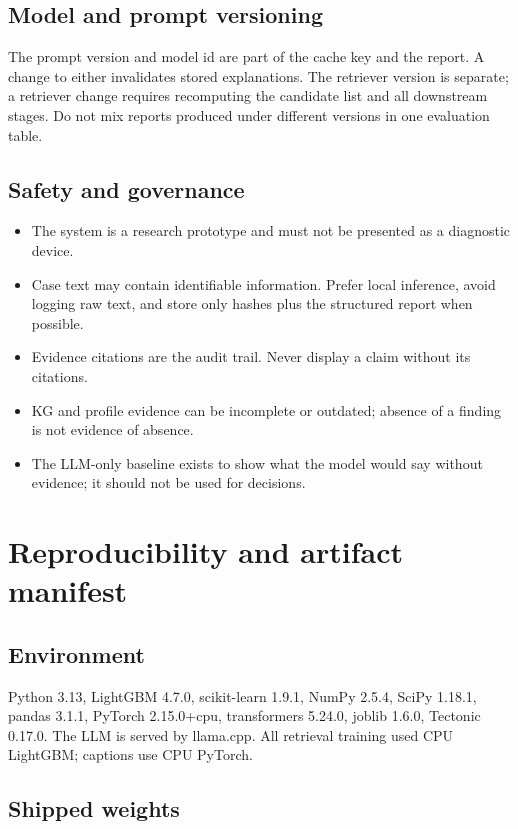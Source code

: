 \documentclass[11pt,a4paper]{article}
\begin{document}
\subsection{Model and prompt versioning}

The prompt version and model id are part of the cache key and the report. A change
to either invalidates stored explanations. The retriever version is separate; a
retriever change requires recomputing the candidate list and all downstream stages.
Do not mix reports produced under different versions in one evaluation table.

\subsection{Safety and governance}

\begin{itemize}[leftmargin=1.4em]
\item The system is a research prototype and must not be presented as a diagnostic
device.
\item Case text may contain identifiable information. Prefer local inference, avoid
logging raw text, and store only hashes plus the structured report when possible.
\item Evidence citations are the audit trail. Never display a claim without its
citations.
\item KG and profile evidence can be incomplete or outdated; absence of a finding
is not evidence of absence.
\item The LLM-only baseline exists to show what the model would say without
evidence; it should not be used for decisions.
\end{itemize}

\section{Reproducibility and artifact manifest}

\subsection{Environment}

Python 3.13, LightGBM 4.7.0, scikit-learn 1.9.1, NumPy 2.5.4, SciPy 1.18.1,
pandas 3.1.1, PyTorch 2.15.0+cpu, transformers 5.24.0, joblib 1.6.0, Tectonic
0.17.0. The LLM is served by llama.cpp. All retrieval training used CPU
LightGBM; captions use CPU PyTorch.

\subsection{Shipped weights}
\end{document}
